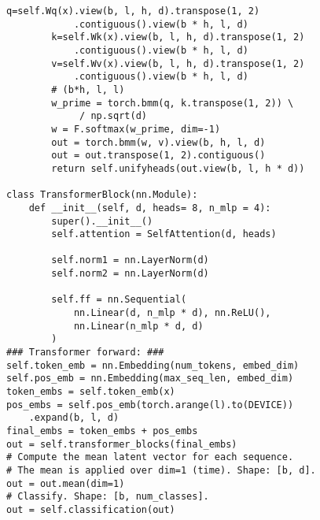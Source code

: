 \begin{lstlisting}[style=mypython]
        q=self.Wq(x).view(b, l, h, d).transpose(1, 2)
            .contiguous().view(b * h, l, d)
        k=self.Wk(x).view(b, l, h, d).transpose(1, 2)
            .contiguous().view(b * h, l, d)
        v=self.Wv(x).view(b, l, h, d).transpose(1, 2)
            .contiguous().view(b * h, l, d)
        # (b*h, l, l)
        w_prime = torch.bmm(q, k.transpose(1, 2)) \ 
             / np.sqrt(d)
        w = F.softmax(w_prime, dim=-1) 
        out = torch.bmm(w, v).view(b, h, l, d)
        out = out.transpose(1, 2).contiguous()
        return self.unifyheads(out.view(b, l, h * d))

class TransformerBlock(nn.Module):    
    def __init__(self, d, heads= 8, n_mlp = 4):
        super().__init__()
        self.attention = SelfAttention(d, heads)
        
        self.norm1 = nn.LayerNorm(d)
        self.norm2 = nn.LayerNorm(d)

        self.ff = nn.Sequential(
            nn.Linear(d, n_mlp * d), nn.ReLU(),
            nn.Linear(n_mlp * d, d)
        )
### Transformer forward: ###
self.token_emb = nn.Embedding(num_tokens, embed_dim)
self.pos_emb = nn.Embedding(max_seq_len, embed_dim)
token_embs = self.token_emb(x)
pos_embs = self.pos_emb(torch.arange(l).to(DEVICE))
    .expand(b, l, d)
final_embs = token_embs + pos_embs
out = self.transformer_blocks(final_embs)
# Compute the mean latent vector for each sequence.
# The mean is applied over dim=1 (time). Shape: [b, d].
out = out.mean(dim=1)
# Classify. Shape: [b, num_classes].
out = self.classification(out)


\end{lstlisting}
